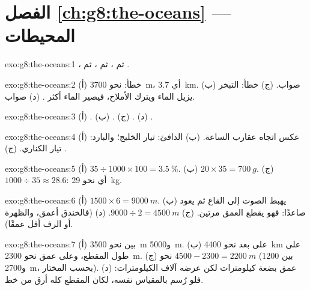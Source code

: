 \section*{الفصل \ref{ch:g8:the-oceans} --- المحيطات}

\begin{solution}{exo:g8:the-oceans:1}
، ثم ، ثم ، ثم .
\end{solution}

\begin{solution}{exo:g8:the-oceans:2}
(أ) خطأ: نحو \qty{3700}{m}، أي \qty{3.7}{km}. (ب) صواب. (ج)
خطأ: التبخر يزيل الماء ويترك الأملاح، فيصير الماء أكثر
. (د) صواب.
\end{solution}

\begin{solution}{exo:g8:the-oceans:3}
(أ) . (ب) . (ج) . (د) .
\end{solution}

\begin{solution}{exo:g8:the-oceans:4}
(أ) عكس اتجاه عقارب الساعة. (ب) الدافئ: تيار الخليج؛ والبارد: تيار الكناري.
(ج) .
\end{solution}

\begin{solution}{exo:g8:the-oceans:5}
(أ) $35 \div 1000 \times 100 = 3.5~\%$. (ب) $20 \times 35 = \qty{700}{g}$.
(ج) $1000 \div 35 \approx 28.6$: أي نحو \qty{29}{kg}.
\end{solution}

\begin{solution}{exo:g8:the-oceans:6}
(أ) $1500 \times 6 = \qty{9000}{m}$. (ب) يهبط الصوت إلى القاع ثم يعود
صاعدًا: فهو يقطع العمق مرتين. (ج) $9000 \div 2 =
\qty{4500}{m}$. (د)  (فالخندق أعمق، والظهرة أو الرف
أقل عمقًا).
\end{solution}

\begin{solution}{exo:g8:the-oceans:7}
(أ) بين نحو \qty{3500}{m} و\qty{5000}{m}. (ب) على بعد نحو \qty{4400}{km} على طول المقطع، وعلى عمق نحو \qty{2300}{m}. (ج) نحو
$4500 - 2300 = \qty{2200}{m}$ (بين 1200 و\qty{2700}{m}، بحسب 
المختار). (د) عمق  بضعة كيلومترات لكن عرضه آلاف الكيلومترات: فلو رُسم
بالمقياس نفسه، لكان المقطع كله أرق من خط.
\end{solution}

